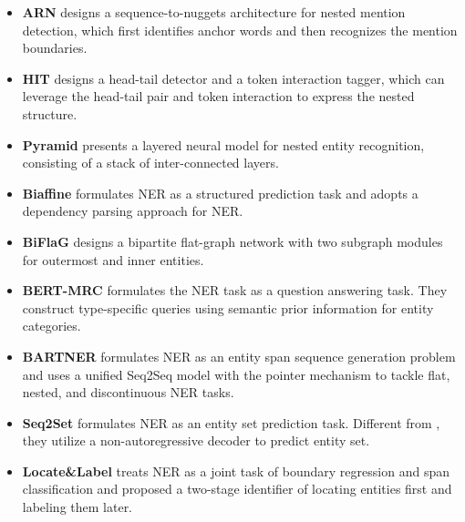 \documentclass[11pt]{article}
\begin{document}
\begin{itemize}
    \item \textbf{ARN} \citep{lin-etal-2019-sequence} designs a sequence-to-nuggets architecture for nested mention detection, which first identifies anchor words and then recognizes the mention boundaries.
    \item \textbf{HIT} \citep{wang-etal-2020-hit} designs a head-tail detector and a  token interaction tagger, which can leverage
the head-tail pair and token interaction to express the nested structure.
    \item \textbf{Pyramid} \citep{wang-etal-2020-pyramid} presents a layered neural model for nested entity recognition, consisting of a stack of inter-connected layers.
    \item \textbf{Biaffine} \citep{yu-etal-2020-named} formulates NER as a structured prediction task and adopts a dependency parsing approach for NER.
    \item \textbf{BiFlaG} \citep{luo-zhao-2020-bipartite} designs a bipartite flat-graph network with two subgraph modules for outermost and inner entities.
    \item \textbf{BERT-MRC} \citep{li-etal-2020-unified} formulates the NER task as a question answering task. They construct type-specific queries using semantic prior information for entity categories.
    \item \textbf{BARTNER} \citep{yan2021bartner} formulates NER as an entity span sequence generation problem and uses a unified Seq2Seq model with the pointer mechanism to tackle flat, nested, and discontinuous NER tasks.
    \item \textbf{Seq2Set} \citep{tan2021sequencetoset} formulates NER as an entity set prediction task. Different from \citet{strakova-etal-2019-neural}, they utilize a non-autoregressive decoder to predict entity set.
    \item \textbf{Locate\&Label} \citep{shen2021locateandlabel} treats NER as a joint task of boundary regression and span classification and proposed a two-stage identifier of locating entities first and labeling them later.
\end{itemize}
\end{document}

